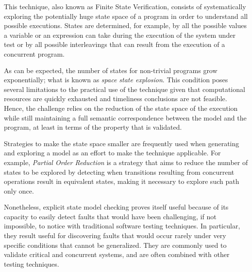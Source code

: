 
\label{subsec:explicit-state-model-checking}

This technique, also known as Finite State Verification, consists of systematically exploring the potentially huge state space of a program in order to understand all possible executions. States are determined, for example, by all the possible values a variable or an expression can take during the execution of the system under test or by all possible interleavings that can result from the execution of a concurrent program. 

As can be expected, the number of states for non-trivial programs grow exponentially; what is known as \textit{space state explosion}. This condition poses several limitations to the practical use of the technique given that computational resources are quickly exhausted and timeliness conclusions are not feasible. Hence, the challenge relies on the reduction of the state space of the execution while still maintaining a full semantic correspondence between the model and the program, at least in terms of the property that is validated.

Strategies to make the state space smaller are frequently used when generating and exploring a model as an effort to make the technique applicable. For example, \textit{Partial Order Reduction} is a strategy that aims to reduce the number of states to be explored by detecting when transitions resulting from concurrent operations result in equivalent states, making it necessary to explore such path only once. 

Nonetheless, explicit state model checking proves itself useful because of its capacity to easily detect faults that would have been challenging, if not impossible, to notice with traditional software testing techniques. In particular, they result useful for discovering faults that would occur rarely under very specific conditions that cannot be generalized. They are commonly used to validate critical and concurrent systems, and are often combined with other testing techniques.


\label{subsec:symbolic-execution}

